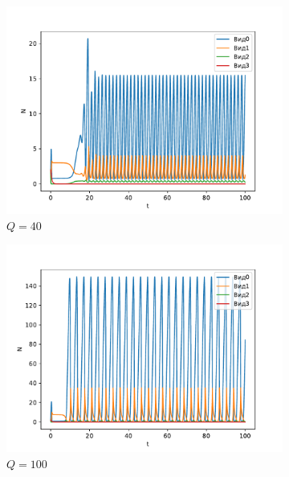 \begin{figure}[H]
    \centering
    \begin{subfigure}[t]{.3\linewidth}
        \centering
        \includegraphics[width=\textwidth]{pictures/exp_flow/exp2_Q40.pdf}
        \caption{\(Q = 40\)}
    \end{subfigure}
    \begin{subfigure}[t]{.3\linewidth}
        \centering
        \includegraphics[width=\textwidth]{pictures/exp_flow/exp2_Q100.pdf}
        \caption{\(Q = 100\)}
    \end{subfigure}
    \begin{subfigure}[t]{.3\linewidth}
        \centering

\end{subfigure}
\end{figure}
